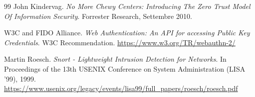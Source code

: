 \begin{thebibliography}{99}
John Kindervag.
\textit{No More Chewy Centers: Introducing The Zero Trust Model Of Information Security}.
Forrester Research, Settembre 2010.

W3C and FIDO Alliance.
\textit{Web Authentication: An API for accessing Public Key Credentials}.
W3C Recommendation.
\url{https://www.w3.org/TR/webauthn-2/}

Martin Roesch.
\textit{Snort - Lightweight Intrusion Detection for Networks}.
In Proceedings of the 13th USENIX Conference on System Administration (LISA '99), 1999.
\url{https://www.usenix.org/legacy/events/lisa99/full_papers/roesch/roesch.pdf}

\end{thebibliography}
